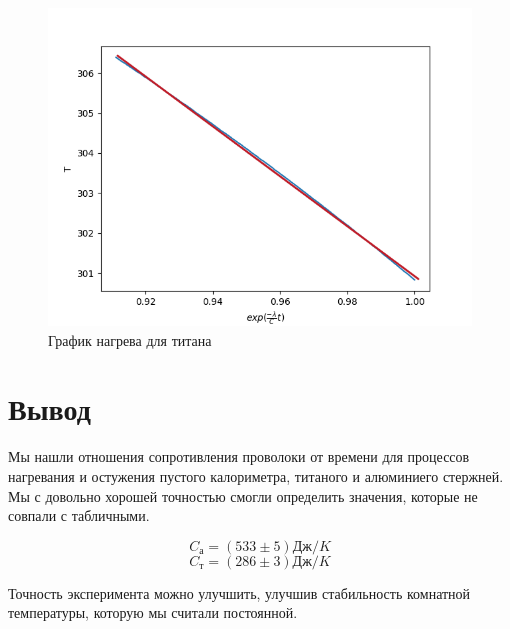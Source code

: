 \documentclass[a4paper]{article}
\begin{document}
\begin{figure}[h!]
    \includegraphics[scale=0.7]{titasd.png}
    \caption{График нагрева для титана}
\end{figure}

\clearpage

\section{Вывод}

Мы нашли отношения сопротивления проволоки от времени для процессов
нагревания и остужения пустого калориметра, титаного и алюминиего стержней.
Мы с довольно хорошей точностью смогли определить значения, которые не
совпали с табличными.

\begin{equation*}
    C_\text{а} = (533 \pm 5) \text{Дж}/K
\end{equation*}
\begin{equation*}
    C_\text{т} = (286 \pm 3) \text{Дж}/K
\end{equation*}

Точность эксперимента можно улучшить, улучшив стабильность комнатной температуры,
которую мы считали постоянной.
\end{document}
